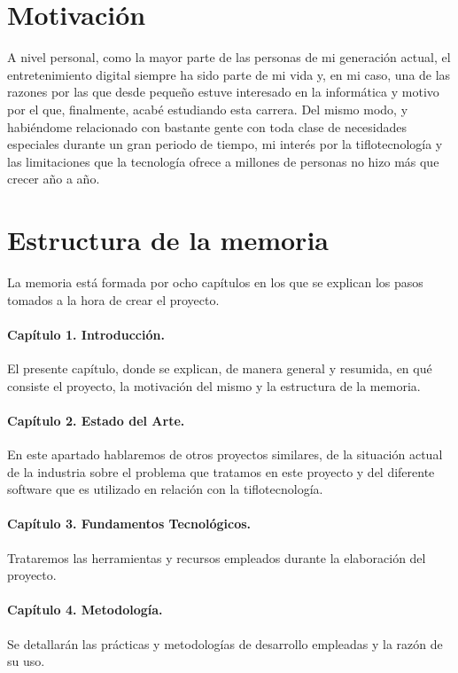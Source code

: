 \section{Motivación}
A nivel personal, como la mayor parte de las personas de mi generación actual, el entretenimiento digital siempre ha sido parte de mi vida y, en mi caso, una de las razones por las que desde pequeño estuve interesado en la informática y motivo por el que, finalmente, acabé estudiando esta carrera. Del mismo modo, y habiéndome relacionado con bastante gente con toda clase de necesidades especiales durante un gran periodo de tiempo, mi interés por la tiflotecnología y las limitaciones que la tecnología ofrece a millones de personas no hizo más que crecer año a año.

\section{Estructura de la memoria}

La memoria está formada por ocho capítulos en los que se explican los pasos tomados a la hora de crear el proyecto.

\paragraph*{Capítulo 1. Introducción.}
El presente capítulo, donde se explican, de manera general y resumida, en qué consiste el proyecto, la motivación del mismo y la estructura de la memoria.

\paragraph*{Capítulo 2. Estado del Arte.}
En este apartado hablaremos de otros proyectos similares, de la situación actual de la industria sobre el problema que tratamos en este proyecto y del diferente software que es utilizado en relación con la tiflotecnología.

\paragraph*{Capítulo 3. Fundamentos Tecnológicos.}
Trataremos las herramientas y recursos empleados durante la elaboración del proyecto.

\paragraph*{Capítulo 4. Metodología.}
Se detallarán las prácticas y metodologías de desarrollo empleadas y la razón de su uso.

